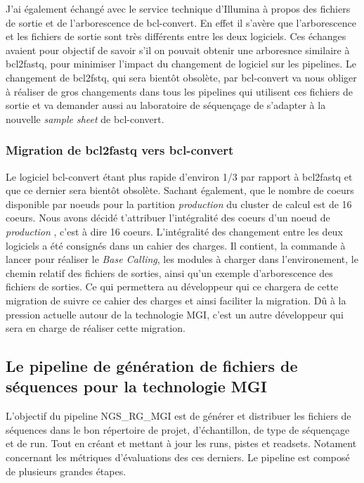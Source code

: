 J'ai également échangé avec le service technique d'Illumina à propos des fichiers de sortie et de l'arborescence de bcl-convert. En effet il s'avère que l'arborescence et les fichiers de sortie sont très différents entre les deux logiciels. Ces échanges avaient pour objectif de savoir s'il on pouvait obtenir une arboresnce similaire à bcl2fastq, pour minimiser l'impact du changement de logiciel sur les pipelines. Le changement de bcl2fstq, qui sera bientôt obsolète, par bcl-convert va nous obliger à réaliser de gros changements dans tous les pipelines qui utilisent ces fichiers de sortie et va demander aussi au laboratoire de séquençage de s'adapter à la nouvelle \emph{sample sheet} de bcl-convert.

\subsubsection{Migration de bcl2fastq vers bcl-convert}
Le logiciel bcl-convert étant plus rapide d'environ 1/3 par rapport à bcl2fastq et que ce dernier sera bientôt obsolète. Sachant également, que le nombre de coeurs disponible par noeuds pour la partition \og \emph{production} \fg{}du cluster de calcul est de 16 coeurs. Nous avons décidé t'attribuer l'intégralité des coeurs d'un noeud de \og\emph{production} \fg{}, c'est à dire 16 coeurs. L'intégralité des changement entre les deux logiciels a été consignés dans un cahier des charges. Il contient, la commande à lancer pour réaliser le \emph{Base Calling}, les modules à charger dans l'environement, le chemin relatif des fichiers de sorties, ainsi qu'un exemple d'arborescence des fichiers de sorties. Ce qui permettera au développeur qui ce chargera de cette migration de suivre ce cahier des charges et ainsi faciliter la migration. Dû à la pression actuelle autour de la technologie MGI, c'est un autre développeur qui sera en charge de réaliser cette migration.


\subsection{Le pipeline de génération de fichiers de séquences pour la technologie MGI}
L'objectif du pipeline NGS\_RG\_MGI est de générer et distribuer les fichiers de séquences dans le bon répertoire de projet, d'échantillon, de type de séquençage et de run.
Tout en créant et mettant à jour les runs, pistes et readsets.
Notament concernant les métriques d'évaluations des ces derniers.
Le pipeline est composé de plusieurs grandes étapes.\\

